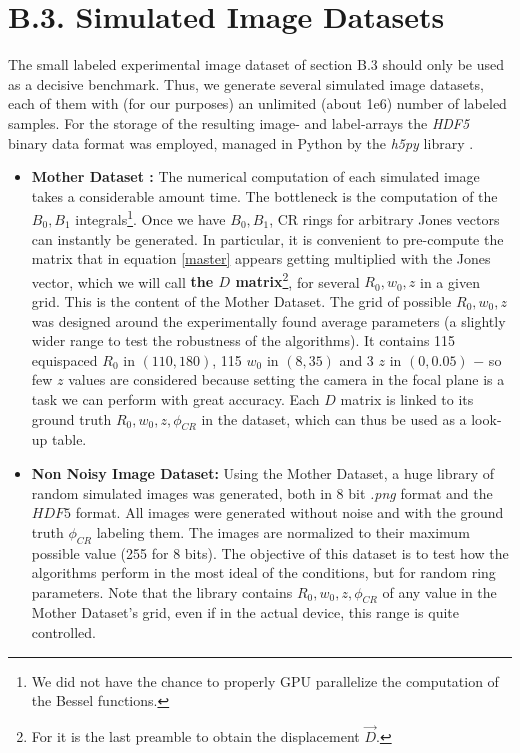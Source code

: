 \documentclass[11pt, a4paper, twoside]{article} %
\begin{document}
\section*{B.3. Simulated Image Datasets }
The small labeled experimental image dataset of section B.3 should only be used as a decisive benchmark. Thus, we generate several simulated image datasets, each of them with (for our purposes) an unlimited (about 1e6) number of labeled samples. For the storage of the resulting image- and label-arrays the {\em HDF5} binary data format was employed, managed in Python by the {\em h5py} library \cite{h5f}.
\begin{itemize}
\item {\bf Mother Dataset :} The numerical computation of each simulated image takes a considerable amount time. The bottleneck is the computation of the $B_0,B_1$ integrals\footnote{We did not have the chance to properly GPU parallelize the computation of the Bessel functions.}. Once we have $B_0,B_1$, CR rings for arbitrary Jones vectors can instantly be generated. In particular, it is convenient to pre-compute the matrix that in equation \eqref{master} appears getting multiplied with the Jones vector, which we will call {\bf the $D$ matrix}\footnote{For it is the last preamble to obtain the displacement $\vec{D}$.}, for several $R_0,w_0,z$ in a given grid. This is the content of the Mother Dataset. The grid of possible $R_0,w_0,z$ was designed around the experimentally found average parameters (a slightly wider range to test the robustness of the algorithms). It contains 115 equispaced $R_0$ in $(110,180)$, 115 $w_0$ in $(8,35)$ and 3 $z$ in $(0,0.05)$ $-$ so few $z$ values are considered because setting the camera in the focal plane is a task we can perform with great accuracy. Each $D$ matrix is linked to its ground truth $R_0,w_0,z,\phi_{CR}$ in the dataset, which can thus be used as a look-up table.

\item {\bf Non Noisy Image Dataset:} Using the Mother Dataset, a huge library of random simulated images was generated, both in 8 bit {\em .png} format and the $HDF5$ format. All images were generated without noise and with the ground truth $\phi_{CR}$ labeling them. The images are normalized to their maximum possible value (255 for 8 bits). The objective of this dataset is to test how the algorithms perform in the most ideal of the conditions, but for random ring parameters. Note that the library contains $R_0,w_0,z,\phi_{CR}$ of any value in the Mother Dataset's grid, even if in the actual device, this range is quite controlled. 


\end{itemize}
\end{document}
